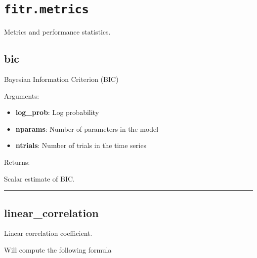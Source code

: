 \hypertarget{fitr.metrics}{%
\section{\texorpdfstring{\texttt{fitr.metrics}}{fitr.metrics}}\label{fitr.metrics}}

Metrics and performance statistics.

\hypertarget{bic}{%
\subsection{bic}\label{bic}}

\begin{Shaded}
\begin{Highlighting}[]
\end{Highlighting}
\end{Shaded}

Bayesian Information Criterion (BIC)

Arguments:

\begin{itemize}
\tightlist
\item
  \textbf{log\_prob}: Log probability
\item
  \textbf{nparams}: Number of parameters in the model
\item
  \textbf{ntrials}: Number of trials in the time series
\end{itemize}

Returns:

Scalar estimate of BIC.

\begin{center}\rule{0.5\linewidth}{\linethickness}\end{center}

\hypertarget{linear_correlation}{%
\subsection{linear\_correlation}\label{linear_correlation}}

\begin{Shaded}
\begin{Highlighting}[]
\end{Highlighting}
\end{Shaded}

Linear correlation coefficient.

Will compute the following formula

